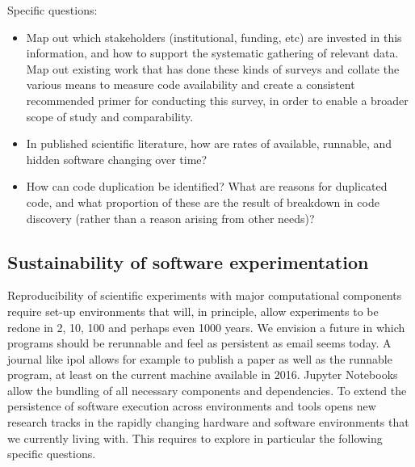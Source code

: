 \documentclass[a4paper,UKenglish]{dagman}
\begin{document}
Specific questions:
\begin{itemize}
\item Map out which stakeholders (institutional, funding, etc) are invested in this information, and how to support the systematic gathering of relevant data. Map out existing work that has done these kinds of surveys and collate the various means to measure code availability and create a consistent recommended primer for conducting this survey, in order to enable a broader scope of study and comparability.
\item In published scientific literature, how are rates of available, runnable, and hidden software changing over time?
\item How can code duplication be identified? What are reasons for duplicated code, and what proportion of these are the result of breakdown in code discovery (rather than a reason arising from other needs)?
\end{itemize}

\subsection{Sustainability of software experimentation}

Reproducibility of scientific experiments with major computational components require set-up environments that will, in principle, allow experiments to be redone in 2, 10, 100 and perhaps even 1000 years. We envision a future in which programs should be rerunnable and feel as persistent as email seems today. A journal like ipol allows for example to publish a paper as well as the runnable program, at least on the current machine available in 2016. Jupyter Notebooks allow the bundling of all necessary components and dependencies. To extend the persistence of software execution across environments and tools opens new research tracks in the rapidly changing hardware and software environments that we currently living with. This requires to explore in particular the following specific questions. 
\end{document}
